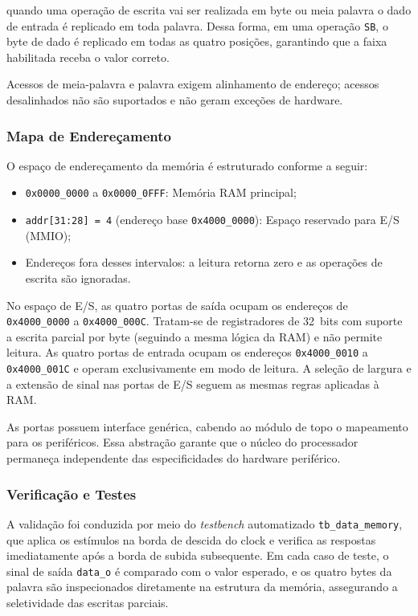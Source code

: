 quando uma operação de escrita vai ser realizada em byte ou meia palavra o dado de entrada é replicado em toda palavra. Dessa forma, em uma operação \texttt{SB}, o byte de dado é replicado em todas as quatro posições, garantindo que a faixa habilitada receba o valor correto. 

Acessos de meia-palavra e palavra exigem alinhamento de endereço; acessos desalinhados não são suportados e não geram exceções de hardware.

\subsubsection{Mapa de Endereçamento}
\label{subsub:enderecamento}

O espaço de endereçamento da memória é estruturado conforme a seguir:
\begin{itemize}
    \item \texttt{0x0000\_0000} a \texttt{0x0000\_0FFF}: Memória RAM principal;
    \item \texttt{addr[31:28] = 4} (endereço base \texttt{0x4000\_0000}): Espaço reservado para E/S (MMIO);
    \item Endereços fora desses intervalos: a leitura retorna zero e as operações de escrita são ignoradas.
    
\end{itemize}

No espaço de E/S, as quatro portas de saída ocupam os endereços de \texttt{0x4000\_0000} a \texttt{0x4000\_000C}. Tratam-se de registradores de 32~bits com suporte a escrita parcial por byte (seguindo a mesma lógica da RAM) e não permite leitura. As quatro portas de entrada ocupam os endereços \texttt{0x4000\_0010} a \texttt{0x4000\_001C} e operam exclusivamente em modo de leitura. A seleção de largura e a extensão de sinal nas portas de E/S seguem as mesmas regras aplicadas à RAM. 

As portas possuem interface genérica, cabendo ao módulo de topo o mapeamento para os periféricos.
Essa abstração garante que o núcleo do processador permaneça independente das especificidades do hardware periférico.

\subsubsection{Verificação e Testes}
\label{subsub:testebenchMemoriaDados}

A validação foi conduzida por meio do \textit{testbench} automatizado \texttt{tb\_data\_memory}, que aplica os estímulos na borda de descida do clock e verifica as respostas imediatamente após a borda de subida subsequente. Em cada caso de teste, o sinal de saída \texttt{data\_o} é comparado com o valor esperado, e os quatro bytes da palavra são inspecionados diretamente na estrutura da memória, assegurando a seletividade das escritas parciais.

